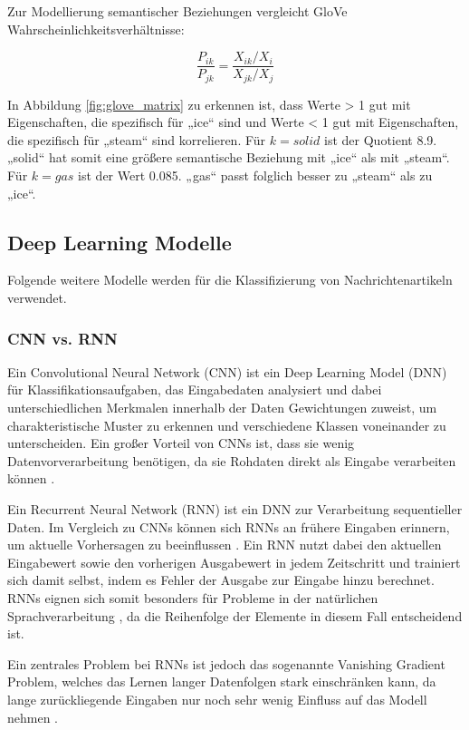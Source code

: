 Zur Modellierung semantischer Beziehungen vergleicht GloVe Wahrscheinlichkeitsverhältnisse:

\[
\frac{P_{ik}}{P_{jk}} = \frac{X_{ik} / X_i}{X_{jk} / X_j}
\]

In Abbildung \ref{fig:glove_matrix} zu erkennen ist, dass Werte > 1 gut mit Eigenschaften, die spezifisch für „ice“ sind
und Werte < 1 gut mit Eigenschaften, die spezifisch für „steam“ sind korrelieren.
Für $k=solid$ ist der Quotient 8.9. „solid“ hat somit eine größere semantische Beziehung mit „ice“ als mit „steam“.
Für $k=gas$ ist der Wert 0.085. „gas“ passt folglich besser zu „steam“ als zu „ice“.


\subsection{Deep Learning Modelle}
\label{sec:deep_learning_modelle}

Folgende weitere Modelle werden für die Klassifizierung von Nachrichtenartikeln verwendet.

\subsubsection{CNN vs. RNN}

Ein Convolutional Neural Network (CNN) ist ein Deep Learning Model (DNN) für Klassifikationsaufgaben,
das Eingabedaten analysiert und dabei unterschiedlichen Merkmalen innerhalb der Daten Gewichtungen zuweist,
um charakteristische Muster zu erkennen und verschiedene Klassen voneinander zu unterscheiden.
Ein großer Vorteil von CNNs ist, dass sie wenig Datenvorverarbeitung benötigen, da sie Rohdaten direkt als Eingabe verarbeiten 
können \cite{aslam2022}.

Ein Recurrent Neural Network (RNN) ist ein DNN zur Verarbeitung sequentieller Daten.
Im Vergleich zu CNNs können sich RNNs an frühere Eingaben erinnern, um aktuelle Vorhersagen zu beeinflussen \cite{Deshai:2023aa}.
Ein RNN nutzt dabei den aktuellen Eingabewert sowie den vorherigen Ausgabewert in jedem Zeitschritt 
und trainiert sich damit selbst, indem es Fehler der Ausgabe zur Eingabe hinzu berechnet.
RNNs eignen sich somit besonders für Probleme in der natürlichen Sprachverarbeitung \cite{Wang:2020aa}, 
da die Reihenfolge der Elemente in diesem Fall entscheidend ist.

Ein zentrales Problem bei RNNs ist jedoch das sogenannte Vanishing Gradient Problem, welches das Lernen 
langer Datenfolgen stark einschränken kann, da lange zurückliegende Eingaben nur noch sehr wenig Einfluss auf das Modell nehmen \cite{aslam2022}.

